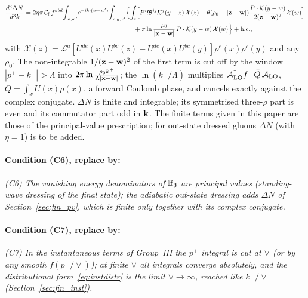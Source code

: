 {{\begin{align*}
\frac{d^3\Delta N}{d^3k}&=2\eta\pi\,\mathcal C_{\rm f}\,f^{abd}\!\int_{w,w'}\!e^{-ik\cdot(w-w')}\!\int_{x,y,x'}\!\Big\{\!\int_z\!\Big[P^i\mathfrak B^{ij}\Kv^j(y-z)\,\mathcal X(z)-\theta(\rho_0-|\v z-\v w|)\frac{P\cdot\Kv(y-w)}{2(\v z-\v w)^2}\mathcal X(w)\Big]\\&\hspace{6cm}+\pi\ln\frac{\rho_0}{|\v x-\v w|}\,P\cdot\Kv(y-w)\,\mathcal X(w)\Big\}+{\rm h.c.},
\end{align*}
with $\mathcal X(z)=\mathcal L^a[U^{de}(x)U^{bc}(z)-U^{de}(x)U^{bc}(y)]\rho^e(x)\rho^c(y)$ and any $\rho_0$. The non-integrable $1/(\mathbf{z}-\mathbf{w})^2$ of the first term is cut off by the window $|p^+-k^+|>\Lambda$ into $2\pi\ln\frac{\rho_0k^+}{\Lambda|\mathbf{x}-\mathbf{w}|}$; the $\ln(k^+/\Lambda)$ multiplies $\mathcal A^\dagger_{\rm LO}f\cdot\bar Q\,\mathcal A_{\rm LO}$, $\bar Q=\int_xU(x)\rho(x)$, a forward Coulomb phase, and cancels exactly against the complex conjugate. $\Delta N$ is finite and integrable; its symmetrised three-$\rho$ part is even and its commutator part odd in $\mathbf{k}$. The finite terms given in this paper are those of the principal-value prescription; for out-state dressed gluons $\Delta N$ (with $\eta=1$) is to be added.
}}

\paragraph{Condition (C6), replace by:} \emph{(C6) The vanishing energy denominators of $\mathbb{B}_3$ are principal values (standing-wave dressing of the final state); the adiabatic out-state dressing adds $\Delta N$ of Section~\ref{sec:fin_pv}, which is finite only together with its complex conjugate.}

\paragraph{Condition (C7), replace by:} \emph{(C7) In the instantaneous terms of Group~III the $p^+$ integral is cut at $\vee$ (or by any smooth $f(p^+/\vee)$); at finite $\vee$ all integrals converge absolutely, and the distributional form~\eqref{eq:instdistr} is the limit $\vee\to\infty$, reached like $k^+/\vee$ (Section~\ref{sec:fin_inst}).}


